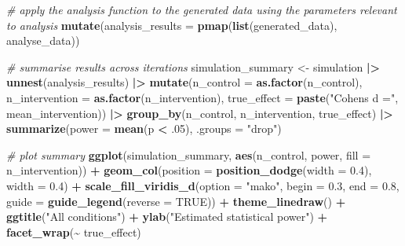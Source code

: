 \documentclass[
]{article}
\newenvironment{Shaded}{\begin{snugshade}}{\end{snugshade}}
\newcommand{\AttributeTok}[1]{\textcolor[rgb]{0.13,0.29,0.53}{#1}}
\newcommand{\CommentTok}[1]{\textcolor[rgb]{0.56,0.35,0.01}{\textit{#1}}}
\newcommand{\ConstantTok}[1]{\textcolor[rgb]{0.56,0.35,0.01}{#1}}
\newcommand{\DecValTok}[1]{\textcolor[rgb]{0.00,0.00,0.81}{#1}}
\newcommand{\FloatTok}[1]{\textcolor[rgb]{0.00,0.00,0.81}{#1}}
\newcommand{\FunctionTok}[1]{\textcolor[rgb]{0.13,0.29,0.53}{\textbf{#1}}}
\newcommand{\NormalTok}[1]{#1}
\newcommand{\OtherTok}[1]{\textcolor[rgb]{0.56,0.35,0.01}{#1}}
\newcommand{\SpecialCharTok}[1]{\textcolor[rgb]{0.81,0.36,0.00}{\textbf{#1}}}
\newcommand{\StringTok}[1]{\textcolor[rgb]{0.31,0.60,0.02}{#1}}
\begin{document}
\begin{Shaded}
\begin{Highlighting}[]
  \CommentTok{\# apply the analysis function to the generated data using the parameters relevant to analysis}
  \FunctionTok{mutate}\NormalTok{(}\AttributeTok{analysis\_results =} \FunctionTok{pmap}\NormalTok{(}\FunctionTok{list}\NormalTok{(generated\_data),}
\NormalTok{                                 analyse\_data))}
  

\CommentTok{\# summarise results across iterations}
\NormalTok{simulation\_summary }\OtherTok{\textless{}{-}}\NormalTok{ simulation }\SpecialCharTok{|\textgreater{}}
  \FunctionTok{unnest}\NormalTok{(analysis\_results) }\SpecialCharTok{|\textgreater{}}
  \FunctionTok{mutate}\NormalTok{(}\AttributeTok{n\_control =} \FunctionTok{as.factor}\NormalTok{(n\_control),}
         \AttributeTok{n\_intervention =} \FunctionTok{as.factor}\NormalTok{(n\_intervention),}
         \AttributeTok{true\_effect =} \FunctionTok{paste}\NormalTok{(}\StringTok{"Cohen\textquotesingle{}s d ="}\NormalTok{, mean\_intervention)) }\SpecialCharTok{|\textgreater{}}
  \FunctionTok{group\_by}\NormalTok{(n\_control,}
\NormalTok{           n\_intervention,}
\NormalTok{           true\_effect) }\SpecialCharTok{|\textgreater{}}
  \FunctionTok{summarize}\NormalTok{(}\AttributeTok{power =} \FunctionTok{mean}\NormalTok{(p }\SpecialCharTok{\textless{}}\NormalTok{ .}\DecValTok{05}\NormalTok{), }\AttributeTok{.groups =} \StringTok{"drop"}\NormalTok{)}

\CommentTok{\# plot summary}
\FunctionTok{ggplot}\NormalTok{(simulation\_summary, }\FunctionTok{aes}\NormalTok{(n\_control, power, }\AttributeTok{fill =}\NormalTok{ n\_intervention)) }\SpecialCharTok{+}
  \FunctionTok{geom\_col}\NormalTok{(}\AttributeTok{position =} \FunctionTok{position\_dodge}\NormalTok{(}\AttributeTok{width =} \FloatTok{0.4}\NormalTok{), }\AttributeTok{width =} \FloatTok{0.4}\NormalTok{) }\SpecialCharTok{+}
  \FunctionTok{scale\_fill\_viridis\_d}\NormalTok{(}\AttributeTok{option =} \StringTok{"mako"}\NormalTok{, }\AttributeTok{begin =} \FloatTok{0.3}\NormalTok{, }\AttributeTok{end =} \FloatTok{0.8}\NormalTok{, }
                       \AttributeTok{guide =} \FunctionTok{guide\_legend}\NormalTok{(}\AttributeTok{reverse =} \ConstantTok{TRUE}\NormalTok{)) }\SpecialCharTok{+}
  \FunctionTok{theme\_linedraw}\NormalTok{() }\SpecialCharTok{+}
  \FunctionTok{ggtitle}\NormalTok{(}\StringTok{"All conditions"}\NormalTok{) }\SpecialCharTok{+}
  \FunctionTok{ylab}\NormalTok{(}\StringTok{"Estimated statistical power"}\NormalTok{) }\SpecialCharTok{+}
  \FunctionTok{facet\_wrap}\NormalTok{(}\SpecialCharTok{\textasciitilde{}}\NormalTok{ true\_effect)}
\end{Highlighting}
\end{Shaded}
\end{document}
